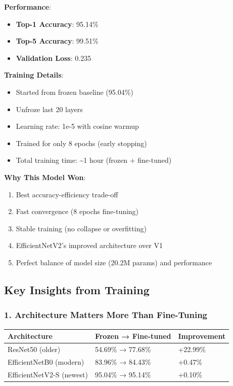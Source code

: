 \documentclass[
  letterpaper,
  DIV=11,
  numbers=noendperiod]{scrartcl}
\providecommand{\tightlist}{%
  \setlength{\itemsep}{0pt}\setlength{\parskip}{0pt}}
\begin{document}
\textbf{Performance}:

\begin{itemize}
\tightlist
\item
  \textbf{Top-1 Accuracy}: 95.14\%
\item
  \textbf{Top-5 Accuracy}: 99.51\%
\item
  \textbf{Validation Loss}: 0.235
\end{itemize}

\textbf{Training Details}:

\begin{itemize}
\tightlist
\item
  Started from frozen baseline (95.04\%)
\item
  Unfroze last 20 layers
\item
  Learning rate: 1e-5 with cosine warmup
\item
  Trained for only 8 epochs (early stopping)
\item
  Total training time: \textasciitilde1 hour (frozen + fine-tuned)
\end{itemize}

\textbf{Why This Model Won}:

\begin{enumerate}
\def\labelenumi{\arabic{enumi}.}
\tightlist
\item
  Best accuracy-efficiency trade-off
\item
  Fast convergence (8 epochs fine-tuning)
\item
  Stable training (no collapse or overfitting)
\item
  EfficientNetV2's improved architecture over V1
\item
  Perfect balance of model size (20.2M params) and performance
\end{enumerate}

\subsection{Key Insights from
Training}\label{key-insights-from-training}

\subsubsection{1. Architecture Matters More Than
Fine-Tuning}\label{architecture-matters-more-than-fine-tuning}

\begin{longtable}[]{@{}lll@{}}
\toprule\noalign{}
Architecture & Frozen → Fine-tuned & Improvement \\
\midrule\noalign{}
\endhead
\bottomrule\noalign{}
\endlastfoot
ResNet50 (older) & 54.69\% → 77.68\% & +22.99\% \\
EfficientNetB0 (modern) & 83.96\% → 84.43\% & +0.47\% \\
EfficientNetV2-S (newest) & 95.04\% → 95.14\% & +0.10\% \\
\end{longtable}
\end{document}
